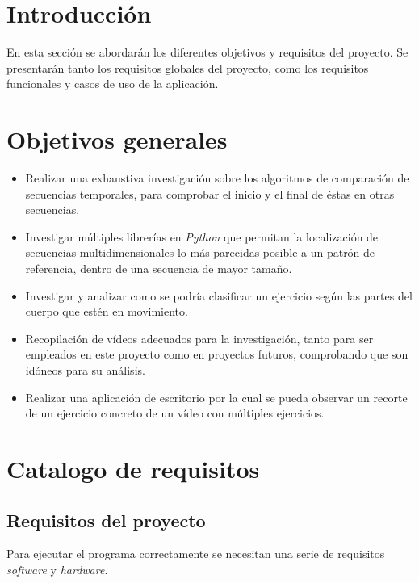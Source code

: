 
\section{Introducción}
En esta sección se abordarán los diferentes objetivos y requisitos del proyecto. Se presentarán tanto los requisitos globales del proyecto, como los requisitos funcionales y casos de uso de la aplicación.

\section{Objetivos generales}
\begin{itemize}
    \item Realizar una exhaustiva investigación sobre los algoritmos de comparación de secuencias temporales, para comprobar el inicio y el final de éstas en otras secuencias.
    \item Investigar múltiples librerías en \textit{Python} que permitan la localización de secuencias multidimensionales lo más parecidas posible a un patrón de referencia, dentro de una secuencia de mayor tamaño.
    \item Investigar y analizar como se podría clasificar un ejercicio según las partes del cuerpo que estén en movimiento.
    \item Recopilación de vídeos adecuados para la investigación, tanto para ser empleados en este proyecto como en proyectos futuros, comprobando que son idóneos para su análisis. 
    \item Realizar una aplicación de escritorio por la cual se pueda observar un recorte de un ejercicio concreto de un vídeo con múltiples ejercicios.
\end{itemize}

\section{Catalogo de requisitos}

\subsection{Requisitos del proyecto}

Para ejecutar el programa correctamente se necesitan una serie de requisitos \textit{software} y \textit{hardware}.



